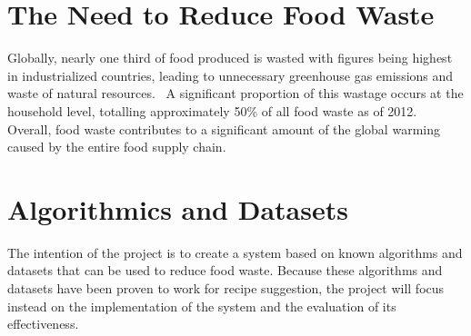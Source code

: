
{
\let\clearpage\relax

\section{The Need to Reduce Food Waste}
Globally, nearly one third of food produced is wasted with figures being highest
in industrialized countries, leading to unnecessary greenhouse gas emissions and
waste of natural resources.~\cite{gustavsson_global_2011} A significant proportion
of this wastage occurs at the household level, totalling approximately 50\% of all
food waste as of 2012.~\cite{stenmarck_estimates_2016} Overall, food waste contributes
to a significant amount of the global warming caused by the entire food supply
chain.~\cite{scherhaufer_environmental_2018}

\section{Algorithmics and Datasets}
The intention of the project is to create a system based on known algorithms and
datasets that can be used to reduce food waste. Because these algorithms and
datasets have been proven to work for recipe suggestion, the project will focus
instead on the implementation of the system and the evaluation of its effectiveness.

} %
